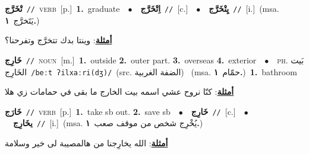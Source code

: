 \documentclass[10pt,a4paper,twoside]{article} %
\begin{document}
\begin{multicols}{2}
{\setlength\topsep{0pt}\textbf{\foreignlanguage{arabic}{تْخَرَّج}}\ {\color{gray}\texttt{//}\color{black}}\ \textsc{verb}\ [p.]\ \textbf{1.}~graduate\ \ $\bullet$\ \ \setlength\topsep{0pt}\textbf{\foreignlanguage{arabic}{اِتْخَرَّج}}\ {\color{gray}\texttt{//}\color{black}}\ [c.]\ \ $\bullet$\ \ \setlength\topsep{0pt}\textbf{\foreignlanguage{arabic}{يِتْخَرَّج}}\ {\color{gray}\texttt{//}\color{black}}\ [i.]\ \color{gray}(msa. \foreignlanguage{arabic}{يَتَخرَّج}~\foreignlanguage{arabic}{\textbf{١.}})\color{black}\  \begin{flushright}\color{gray}\foreignlanguage{arabic}{\textbf{\underline{\foreignlanguage{arabic}{أمثلة}}}: وينتا بدك تتخرَّج وتفرحنا؟}\end{flushright}\color{black}} \vspace{2mm}

{\setlength\topsep{0pt}\textbf{\foreignlanguage{arabic}{خَارِج}}\ {\color{gray}\texttt{//}\color{black}}\ \textsc{noun}\ [m.]\ \textbf{1.}~outside  \textbf{2.}~outer part.  \textbf{3.}~overseas  \textbf{4.}~exterior\ \ $\bullet$\ \ \textsc{ph.} \color{gray} \foreignlanguage{arabic}{بَيت الخَارِج}\color{black}\ {\color{gray}\texttt{/{\sffamily beːt ʔilxaːri(dʒ)}/}\color{black}}\ \color{gray}(src. \foreignlanguage{arabic}{الضفة الغربية})\color{black}\ \color{gray} (msa. \foreignlanguage{arabic}{حمّام}~\foreignlanguage{arabic}{\textbf{١.}})\color{black}\ \textbf{1.}~bathroom\  \begin{flushright}\color{gray}\foreignlanguage{arabic}{\textbf{\underline{\foreignlanguage{arabic}{أمثلة}}}: كنّا نروح عشي اسمه بيت الخارج ما بقى في حمامات زي هلا}\end{flushright}\color{black}} \vspace{2mm}

{\setlength\topsep{0pt}\textbf{\foreignlanguage{arabic}{خَارَج}}\ {\color{gray}\texttt{//}\color{black}}\ \textsc{verb}\ [p.]\ \textbf{1.}~take sb out.  \textbf{2.}~save sb\ \ $\bullet$\ \ \setlength\topsep{0pt}\textbf{\foreignlanguage{arabic}{خَارِج}}\ {\color{gray}\texttt{//}\color{black}}\ [c.]\ \ $\bullet$\ \ \setlength\topsep{0pt}\textbf{\foreignlanguage{arabic}{يخَارِج}}\ {\color{gray}\texttt{//}\color{black}}\ [i.]\ \color{gray}(msa. \foreignlanguage{arabic}{يُخْرِج شخص من موقف صعب}~\foreignlanguage{arabic}{\textbf{١.}})\color{black}\  \begin{flushright}\color{gray}\foreignlanguage{arabic}{\textbf{\underline{\foreignlanguage{arabic}{أمثلة}}}: الله يخارِجنا من هالمصيبة لى خير وسلامة}\end{flushright}\color{black}} \vspace{2mm}


\end{multicols}
\end{document}
